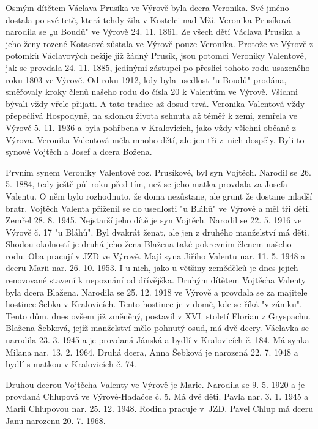 \documentclass[../dejiny-rodu-prusiku.tex]{subfiles}
\begin{document}
Osmým dítětem Václava Prusíka ve Výrově byla dcera Veronika. Své jméno dostala po své tetě, která tehdy žila v Kostelci nad Mží. Veronika Prusíková narodila se „u Boudů" ve Výrově 24. 11. 1861. Ze všech dětí Václava Prusíka a jeho ženy rozené Kotasové zůstala ve Výrově pouze Veronika. Protože ve Výrově z potomků Václavových nežije již žádný Prusík, jsou potomci Veroniky Valentové, jak se provdala 24. 11. 1885, jedinými zástupci po přeslici tohoto rodu usazeného roku 1803 ve Výrově. Od roku 1912, kdy byla usedlost "u Boudů" prodána, směřovaly kroky členů našeho rodu do čísla 20 k Valentům ve Výrově. Všichni bývali vždy vřele přijati. A tato tradice až dosud trvá. Veronika Valentová vždy přepečlivá Hospodyně, na sklonku života sehnuta až téměř k zemi, zemřela ve Výrově 5. 11. 1936 a byla pohřbena v Kralovicích, jako vždy všichni občané z Výrova. Veronika Valentová měla mnoho dětí, ale jen tři z nich dospěly. Byli to synové Vojtěch a Josef a dcera Božena.

Prvním synem Veroniky Valentové roz. Prusíkové, byl syn Vojtěch. Narodil se 26. 5. 1884, tedy ještě půl roku před tím, než se jeho matka provdala za Josefa Valentu. O něm bylo rozhodnuto, že doma nezůstane, ale grunt že dostane mladší bratr. Vojtěch Valenta přiženil se do usedlosti "u Bláhů" ve Výrově a měl tři děti. Zemřel 28. 8. 1945.  Nejstarší jeho dítě je syn Vojtěch. Narodil se 22. 5. 1916 ve Výrově č. 17 "u Bláhů". Byl dvakrát ženat, ale jen
z druhého manželství má děti. Shodou okolností je druhá jeho žena Blažena také pokrevním členem naše­ho rodu. Oba pracují v JZD ve Výrově. Mají syna Jiřího Valentu nar. 11. 5. 1948 a dceru Marii nar. 26. 10. 1953. I u nich, jako u většiny zemědělců je dnes jejich renovované stavení k nepoznání od dřívějška. Druhým dítětem Vojtěcha Valenty byla dcera Blažena. Narodila se 25. 12. 1918 ve Výrově a provdala se za majitele hostince Šebka v Kralovicích. Tento hostinec je v domě, kde se říká "v zámku". Tento dům, dnes ovšem již změněný, postavil v XVI. století Florian z Gryspachu. Blažena Šebková, jejíž manželství mělo pohnutý osud, má dvě dcery. Václavka se narodila 23. 3. 1945 a je provdaná Jánská a bydlí v Kralovicích č. 184. Má synka Milana nar. 13. 2. 1964. Druhá dcera, Anna Šebková je narozená 22. 7. 1948 a bydlí s matkou v Kralovicích č. 74. -

Druhou dcerou Vojtěcha Valenty ve Výrově je Marie. Narodila se 9. 5. 1920 a je provdaná Chlupová ve Výrově-Hadačce č. 5. Má dvě děti. Pavla nar. 3. 1. 1945 a Marii Chlupovou nar. 25. 12. 1948. Rodina pracuje v JZD.  Pavel Chlup má dceru Janu narozenu 20. 7. 1968.
\end{document}
